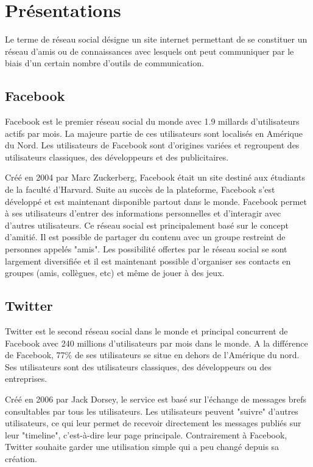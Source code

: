 \documentclass[a4paper,10pt]{article}
\begin{document}
\newpage
\section{Présentations}
Le terme de réseau social désigne un site internet permettant de se constituer un réseau d'amis ou de connaissances avec lesquels ont peut communiquer par le biais d'un certain nombre d'outils de communication.



\subsection{Facebook}
Facebook est le premier réseau social du monde avec 1.9 millards d'utilisateurs actifs par mois. La majeure partie de ces utilisateurs sont localisés en Amérique du Nord. Les utilisateurs de Facebook sont d'origines variées et regroupent des utilisateurs classiques, des développeurs et des publicitaires.


Créé en 2004 par Marc Zuckerberg, Facebook était un site destiné aux étudiants de la faculté d'Harvard. Suite au succès de la plateforme, Facebook s'est développé et est maintenant disponible partout dans le monde. Facebook permet à ses utilisateurs d'entrer des informations personnelles et d’interagir avec d'autres utilisateurs. Ce réseau social est principalement basé sur le concept d'amitié. Il est possible de partager du contenu avec un groupe restreint de personnes appelés "amis".
Les possibilité offertes par le réseau social se sont largement diversifiée et il est maintenant possible d'organiser ses contacts en groupes (amis, collègues, etc) et même de jouer à des jeux.



\subsection{Twitter}

Twitter est le second réseau social dans le monde et principal concurrent de Facebook avec 240 millions d'utilisateurs par mois dans le monde. A la différence de Facebook, 77\% de ses utilisateurs se situe en dehors de l’Amérique du nord. Ses utilisateurs sont des utilisateurs classiques, des développeurs ou des entreprises.

Créé en 2006 par Jack Dorsey, le service est basé sur l'échange de messages brefs consultables par tous les utilisateurs. Les utilisateurs peuvent "suivre" d'autres utilisateurs, ce qui leur permet de recevoir directement les messages publiés sur leur "timeline", c'est-à-dire leur page principale. Contrairement à Facebook, Twitter souhaite garder une utilisation simple qui a peu changé depuis sa création.
\end{document}
